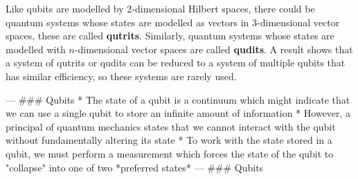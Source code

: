 \documentclass[12pt,twoside]{report}
\begin{document}
Like qubits are modelled by $2$-dimensional Hilbert spaces, there could be quantum systems whose states are modelled as vectors in $3$-dimensional vector spaces, these are called \textbf{qutrits}. Similarly, quantum systems whose states are modelled with $n$-dimensional vector spaces are called \textbf{qudits}. A result shows that a system of qutrits or qudits can be reduced to a system of multiple qubits that has similar efficiency, so these systems are rarely used.

\iffalse
---
### Qubits
* The state of a qubit is a continuum which might indicate that we can use a single qubit to store an infinite amount of information
* However, a principal of quantum mechanics states that we cannot interact with the qubit without fundamentally altering its state
* To work with the state stored in a qubit, we must perform a measurement which forces the state of the qubit to "collapse" into one of two *preferred states*
---
### Qubits
\end{document}
